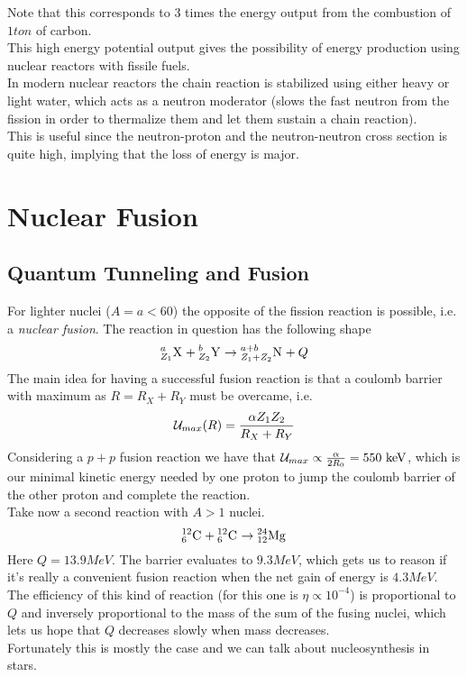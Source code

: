 \documentclass[../qm.tex]{subfiles}
\begin{document}
Note that this corresponds to 3 times the energy output from the combustion of $1\unit{ton}$ of carbon.\\
This high energy potential output gives the possibility of energy production using nuclear reactors with fissile fuels.\\
In modern nuclear reactors the chain reaction is stabilized using either heavy or light water, which acts as a neutron moderator (slows the fast neutron from the fission in order to thermalize them and let them sustain a chain reaction).\\
This is useful since the neutron-proton and the neutron-neutron cross section is quite high, implying that the loss of energy is major.
\section{Nuclear Fusion}
\subsection{Quantum Tunneling and Fusion}
For lighter nuclei ($A=a<60$) the opposite of the fission reaction is possible, i.e. a \emph{nuclear fusion}. The reaction in question has the following shape
\begin{equation}
	\nuc{X}{a}{Z_1}+\nuc{Y}{b}{Z_2}\to\nuc{N}{a+b}{Z_1+Z_2}+Q
	\label{eq:nucfusion}
\end{equation}
The main idea for having a successful fusion reaction is that a coulomb barrier with maximum as $R=R_X+R_Y$ must be overcame, i.e.
\begin{equation*}
	\pot_{max}(R)=\frac{\alpha Z_1Z_2}{R_X+R_Y}
\end{equation*}
Considering a $p+p$ fusion reaction we have that $\pot_{max}\propto\frac{\alpha}{2R_0}=550\unit{keV}$, which is our minimal kinetic energy needed by one proton to jump the coulomb barrier of the other proton and complete the reaction.\\
Take now a second reaction with $A>1$ nuclei.
\begin{equation*}
	\nuc{C}{12}{6}+\nuc{C}{12}{6}\to\nuc{Mg}{24}{12}
\end{equation*}
Here $Q=13.9\unit{MeV}$. The barrier evaluates to $9.3\unit{MeV}$, which gets us to reason if it's really a convenient fusion reaction when the net gain of energy is $4.3\unit{MeV}$. The efficiency of this kind of reaction (for this one is $\eta\propto10^{-4}$) is proportional to $Q$ and inversely proportional to the mass of the sum of the fusing nuclei, which lets us hope that $Q$ decreases slowly when mass decreases.\\
Fortunately this is mostly the case and we can talk about nucleosynthesis in stars.
\end{document}
